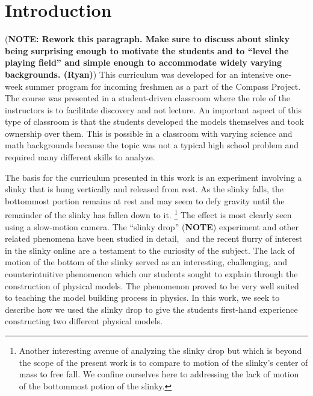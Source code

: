 \documentclass[prb,preprint,superscriptaddress]{revtex4-1}
\newcommand{\NOTEMARG}[1]{\marginpar{\raggedright\scriptsize\textbf{NOTE:} #1} (\textbf{NOTE})}
\newcommand{\NOTE}[1]{\marginpar{\footnotesize\textbf{NOTE}} (\textbf{NOTE: #1})}
\begin{document}
\section{Introduction}
\NOTE{Rework this paragraph. Make sure to discuss about slinky being surprising enough to motivate the students and to ``level the playing field'' and
simple enough to accommodate widely varying backgrounds. (Ryan)}
This curriculum was developed for an intensive one-week summer program for
incoming freshmen as a part of the Compass Project.~\cite{albana2013,Roth2012,drdf2013a,drdf2013b}
The course was presented in a student-driven classroom
where the role of the instructors is to facilitate discovery and not lecture.
An important aspect of this type of classroom is that the students developed the models
themselves and took ownership over them. This is possible in a classroom with varying science
and math backgrounds because the topic was not a typical high school problem and required
many different skills to analyze.

The basis for the curriculum presented in this work is an experiment involving a
slinky that is hung vertically and released from rest. As the
slinky falls, the bottommost portion remains at rest and may seem to defy gravity until the remainder of the
slinky has fallen down to it. 
\footnote{Another interesting avenue of analyzing the slinky drop but which is beyond the scope of the present
work is to compare to motion of the slinky's center of mass to free fall. We confine ourselves here to
addressing the lack of motion of the bottommost potion of the slinky.}
The effect is most clearly seen using a slow-motion camera.
The ``slinky drop''\NOTEMARG{Add multi-frame figure with labels. (Jesse)} experiment and other related phenomena have
been studied in detail,~\cite{calkin1993, newburgh1995, graham2001, aguirregabiria2007,unruh2011, cross2012}
and the recent flurry of interest in the slinky online \cite{..}
are a testament to the curiosity of the subject.
The lack of motion of the bottom of the slinky
served as an interesting, challenging, and counterintuitive phenomenon which our students sought to explain through
the construction of physical models. The phenomenon proved to be very well suited to
teaching the model building process in physics. In this work,
we seek to describe how we used the slinky drop to give the students first-hand
experience constructing two different physical models.

\end{document}
